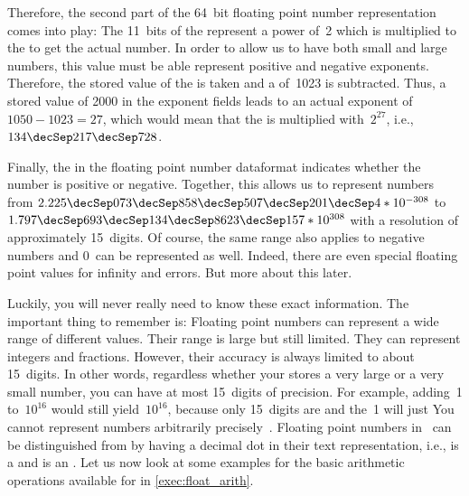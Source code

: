 Therefore, the second part of the 64~bit floating point number representation comes into play:
The 11~bits of the  represent a power of~2 which is multiplied to the  to get the actual number.
In order to allow us to have both small and large numbers, this value must be able represent positive and negative exponents.
Therefore, the stored value of the  is taken and a  of~1023 is subtracted.
Thus, a stored value of 2000 in the exponent fields leads to an actual exponent of $1050-1023=27$, which would mean that the  is multiplied with~$2^{27}$, i.e., $134\decSep217\decSep728$.%
%
\begin{sloppypar}%
Finally, the  in the floating point number dataformat indicates whether the number is positive or negative.
Together, this allows us to represent numbers from $2.225\decSep073\decSep858\decSep507\decSep201\decSep4*10^{-308}$ to $1.797\decSep693\decSep134\decSep8623\decSep157*10^{308}$ with a resolution of approximately 15~digits.
Of course, the same range also applies to negative numbers and $0$~can be represented as well.
Indeed, there are even special floating point values for infinity and errors.
But more about this later.%
\end{sloppypar}%
%
Luckily, you will never really need to know these exact information.
The important thing to remember is:
Floating point numbers can represent a wide range of different values.
Their range is large but still limited.
They can represent integers and fractions.
However, their accuracy is always limited to about 15~digits.
In other words, regardless whether your  stores a very large or a very small number, you can have at most 15~digits of precision.
For example, adding~1 to~$10^{16}$ would still yield~$10^{16}$, because only 15~digits are  and the~1 will just 
You cannot represent numbers arbitrarily precisely~\cite{PSF:P3D:TPT:FPAIAL}.%
%
\endhsection%
%
%
\label{sec:floatarith}%
%
%
%
%
Floating point numbers in \python\ can be distinguished from  by having a decimal dot in their text representation, i.e.,  is a  and  is an .
Let us now look at some examples for the basic arithmetic operations available for  in \cref{exec:float_arith}.

